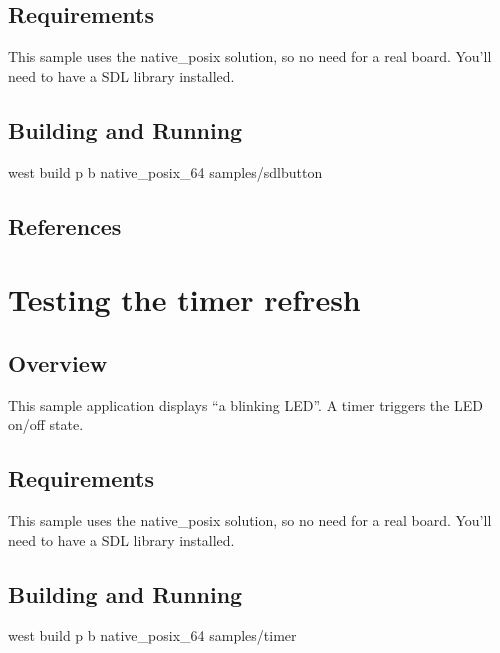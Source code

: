 \documentclass[letterpaper,10pt,english]{sphinxmanual}
\begin{document}
\subsection{Requirements}
\label{\detokenize{samples/samplessdlbuttonREADME:requirements}}
This sample uses the native\_posix solution, so no need for a real board.
You’ll need to have a SDL library installed.


\subsection{Building and Running}
\label{\detokenize{samples/samplessdlbuttonREADME:building-and-running}}
west build \sphinxhyphen{}p \sphinxhyphen{}b native\_posix\_64 samples/sdlbutton


\subsection{References}
\label{\detokenize{samples/samplessdlbuttonREADME:references}}

\section{Testing the timer refresh}
\label{\detokenize{samples/samplestimerREADME:testing-the-timer-refresh}}\label{\detokenize{samples/samplestimerREADME:sdl-sample}}\label{\detokenize{samples/samplestimerREADME::doc}}

\subsection{Overview}
\label{\detokenize{samples/samplestimerREADME:overview}}
This sample application displays “a blinking LED”.
A timer triggers the LED on/off state.


\subsection{Requirements}
\label{\detokenize{samples/samplestimerREADME:requirements}}
This sample uses the native\_posix solution, so no need for a real board.
You’ll need to have a SDL library installed.


\subsection{Building and Running}
\label{\detokenize{samples/samplestimerREADME:building-and-running}}
west build \sphinxhyphen{}p \sphinxhyphen{}b native\_posix\_64 samples/timer
\end{document}
